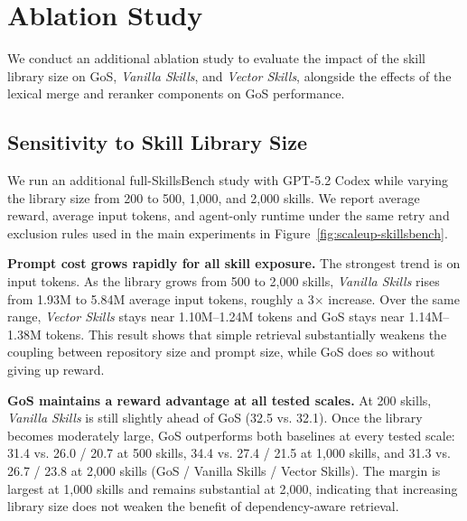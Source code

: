 \section{Ablation Study}
\label{sec:ablation}
We conduct an additional ablation study to evaluate the impact of the skill library size on GoS, \textit{Vanilla Skills}, and \textit{Vector Skills}, alongside the effects of the lexical merge and reranker components on GoS performance.



\subsection{Sensitivity to Skill Library Size}
%
We run an additional full-SkillsBench study with GPT-5.2 Codex while varying the library size from 200 to 500, 1{,}000, and 2{,}000 skills. 
%
We report average reward, average input tokens, and agent-only runtime under the same retry and exclusion rules used in the main experiments in Figure~\ref{fig:scaleup-skillsbench}.



\noindent\textbf{Prompt cost grows rapidly for all skill exposure.}
The strongest trend is on input tokens. 
%
As the library grows from 500 to 2,000 skills, \textit{Vanilla Skills} rises from 1.93M to 5.84M average input tokens, roughly a 3$\times$ increase. Over the same range, \textit{Vector Skills} stays near 1.10M--1.24M tokens and GoS stays near 1.14M--1.38M tokens. 
%
This result shows that simple retrieval substantially weakens the coupling between repository size and prompt size, while GoS does so without giving up reward.

\noindent\textbf{GoS maintains a reward advantage at all tested scales.}
At 200 skills, \textit{Vanilla Skills} is still slightly ahead of GoS (32.5 vs. 32.1). 
%
Once the library becomes moderately large, GoS outperforms both baselines at every tested scale: 31.4 vs. 26.0 / 20.7 at 500 skills, 34.4 vs. 27.4 / 21.5 at 1{,}000 skills, and 31.3 vs. 26.7 / 23.8 at 2{,}000 skills (GoS / Vanilla Skills / Vector Skills). The margin is largest at 1{,}000 skills and remains substantial at 2{,}000, indicating that increasing library size does not weaken the benefit of dependency-aware retrieval.

